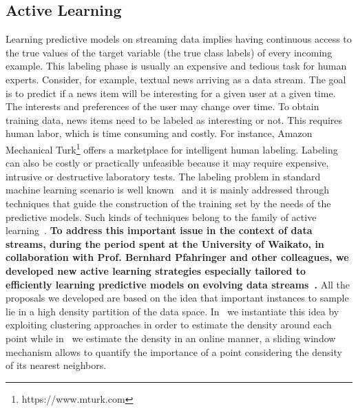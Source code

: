 \subsection{Active Learning}
Learning predictive models on streaming data implies having continuous access to the true values of the target variable (the true class labels) of every incoming example.  This labeling phase is usually an expensive and tedious task for human experts. 
Consider, for example, textual news arriving as a data stream. The goal is to predict if a news item will be interesting for a given user at a given time. The interests and preferences of the user may change over time.
To obtain training data, news items need to be labeled as interesting or not.
This requires human labor, which is time consuming and costly. 
For instance, Amazon Mechanical Turk\footnote{https://www.mturk.com} offers a marketplace for intelligent human labeling.
Labeling can also be costly or practically unfeasible because it may require expensive, intrusive or destructive laboratory tests. 
The labeling problem in standard machine learning scenario is well known~\cite{TongK00} and it is mainly addressed through techniques that guide the construction of the training set by the needs of the predictive models. Such kinds of techniques belong to the family of active learning~\cite{FuZL13}.
\textbf{To address this important issue in the context of data streams, during the period spent at the University of Waikato, in collaboration with Prof. Bernhard Pfahringer and other colleagues, we developed new active learning strategies especially tailored to efficiently learning predictive models on evolving data streams~\cite{IencoBZP13,IencoZP14}.} All the proposals we developed are based on the idea that important instances to sample lie in a high density partition of the data space. In~\cite{IencoBZP13} we instantiate this idea by exploiting clustering approaches in order to estimate the density around each point while in~\cite{IencoZP14} we estimate the density in an online manner, a sliding window mechanism allows to quantify the importance of a point considering the density of its nearest neighbors. 

